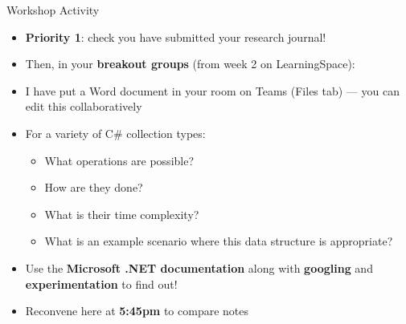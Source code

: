 \begin{frame}{Workshop Activity}
    \begin{itemize}
        \pause\item \textbf{Priority 1}: check you have submitted your research journal!
        \pause\item Then, in your \textbf{breakout groups} (from week 2 on LearningSpace):
        \pause\item I have put a Word document in your room on Teams (Files tab) --- you can edit this collaboratively
        \pause\item For a variety of C\# collection types:
            \begin{itemize}
                \pause\item What operations are possible?
                \pause\item How are they done?
                \pause\item What is their time complexity?
                \pause\item What is an example scenario where this data structure is appropriate?
            \end{itemize}
        \pause\item Use the \textbf{Microsoft .NET documentation} along with \textbf{googling} and \textbf{experimentation} to find out!
        \pause\item Reconvene here at \textbf{5:45pm} to compare notes
    \end{itemize}
\end{frame}
